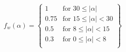 \begin{equation}\label{eq:score_weights}
    f_w(\alpha) = \left\{\begin{array}{lr}
                1 & \text{for } 30 \leq |\alpha|\\
                0.75 & \text{for } 15 \leq |\alpha| < 30\\
                0.5 & \text{for } 8 \leq |\alpha| < 15\\
                0.3 & \text{for } 0 \leq |\alpha| < 8\\
    \end{array}
    \right\}
\end{equation}